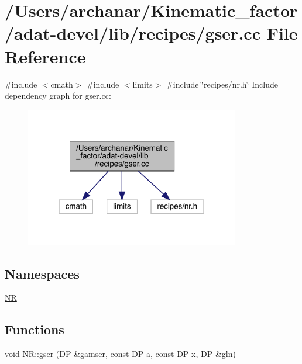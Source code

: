 \hypertarget{adat-devel_2lib_2recipes_2gser_8cc}{}\section{/\+Users/archanar/\+Kinematic\+\_\+factor/adat-\/devel/lib/recipes/gser.cc File Reference}
\label{adat-devel_2lib_2recipes_2gser_8cc}
{\ttfamily \#include $<$cmath$>$}\newline
{\ttfamily \#include $<$limits$>$}\newline
{\ttfamily \#include \char`\"{}recipes/nr.\+h\char`\"{}}\newline
Include dependency graph for gser.\+cc\+:
\nopagebreak
\begin{figure}[H]
\begin{center}
\leavevmode
\includegraphics[width=265pt]{d1/d8f/adat-devel_2lib_2recipes_2gser_8cc__incl}
\end{center}
\end{figure}
\subsection*{Namespaces}
\begin{DoxyCompactItemize}
\item 
 \mbox{\hyperlink{namespaceNR}{NR}}
\end{DoxyCompactItemize}
\subsection*{Functions}
\begin{DoxyCompactItemize}
\item 
void \mbox{\hyperlink{namespaceNR_acf96c684ec4dc14593c22c45848ad511}{N\+R\+::gser}} (DP \&gamser, const DP a, const DP x, DP \&gln)
\end{DoxyCompactItemize}
